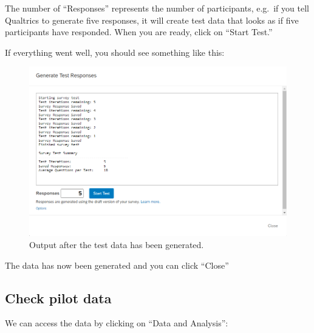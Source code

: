 \documentclass[
]{book}
\begin{document}
The number of ``Responses'' represents the number of participants, e.g.~if you tell Qualtrics to generate five responses, it will create test data that looks as if five participants have responded. When you are ready, click on ``Start Test.''

If everything went well, you should see something like this:

\begin{figure}

{\centering \includegraphics[width=0.85\linewidth]{images/Qualtrics/11testresponses3} 

}

\caption{Output after the test data has been generated.}\label{fig:Figure11-10}
\end{figure}

The data has now been generated and you can click ``Close''

\hypertarget{check-pilot-data}{%
\subsection{Check pilot data}\label{check-pilot-data}}

We can access the data by clicking on ``Data and Analysis'':
\end{document}
